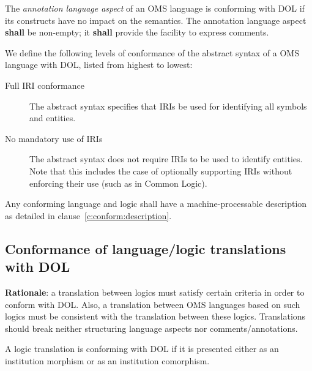 \documentclass[10pt,fleqn,%
\ifpretendfinal
final%
\else
draft%
\fi,
]{scrreprt}
\newcommand*{\shall}{\textbf{shall}\xspace}
\newcommand*{\may}{\textbf{may}\xspace}
\newcommand{\clauserefname}{clause}
\newcommand{\cref}[1]{\clauserefname~\ref{#1}}
\newcommand{\ssclause}[1]{\subsection{#1}}
\begin{document}
The \emph{annotation language aspect} of an OMS language is conforming with DOL if its constructs
have no impact on the semantics. The annotation language aspect \shall be non-empty; it \shall
provide the facility to express comments.

We define the following levels of conformance of the abstract syntax of a 
 OMS language with DOL, listed from highest to lowest:

\begin{description}
\item[Full IRI conformance] The abstract syntax specifies that IRIs be used for
 identifying all symbols and entities.
\item[No mandatory use of IRIs] The abstract syntax does not require  IRIs
 to be used to identify entities. Note that this includes the case of
  optionally supporting IRIs without enforcing their use (such as in Common
  Logic).
\end{description}

Any conforming language and logic shall have a machine-processable description
 as detailed in \cref{c:conform:description}.

\ssclause{Conformance of language/logic translations with DOL}\label{c:conform:translation}
\begin{fminipage}{\textwidth}
\textbf{Rationale}: a translation between logics must satisfy certain criteria in order to conform with DOL.
Also, a translation between OMS languages based on such logics must be consistent with the
translation between these logics.  Translations should break neither structuring language aspects nor comments/annotations.
\end{fminipage}

A logic translation is conforming with DOL if it is presented either as an institution morphism or
as an institution comorphism.  
\end{document}
